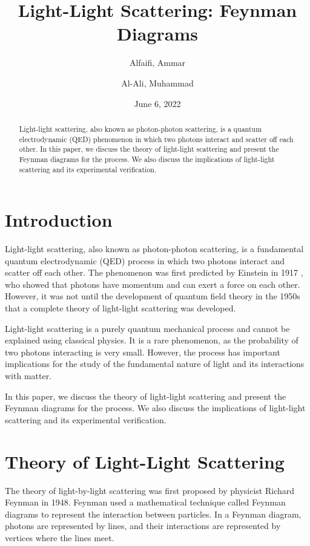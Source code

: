 \documentclass{article}
\title{Light-Light Scattering: Feynman Diagrams}
\author{Alfaifi, Ammar \and Al-Ali, Muhammad}
\date{June 6, 2022}
\begin{document}
\maketitle

\begin{abstract}
	Light-light scattering, also known as photon-photon scattering, is a quantum electrodynamic (QED) phenomenon in which two photons interact and scatter off each other. In this paper, we discuss the theory of light-light scattering and present the Feynman diagrams for the process. We also discuss the implications of light-light scattering and its experimental verification.
\end{abstract}

\section{Introduction}

Light-light scattering, also known as photon-photon scattering, is a fundamental quantum electrodynamic (QED) process in which two photons interact and scatter off each other. The phenomenon was first predicted by Einstein in 1917 \cite{einstein}, who showed that photons have momentum and can exert a force on each other. However, it was not until the development of quantum field theory in the 1950s that a complete theory of light-light scattering was developed.

Light-light scattering is a purely quantum mechanical process and cannot be explained using classical physics. It is a rare phenomenon, as the probability of two photons interacting is very small. However, the process has important implications for the study of the fundamental nature of light and its interactions with matter.

In this paper, we discuss the theory of light-light scattering and present the Feynman diagrams for the process. We also discuss the implications of light-light scattering and its experimental verification.

\section{Theory of Light-Light Scattering}

The theory of light-by-light scattering was first proposed by physicist Richard Feynman in 1948. Feynman used a mathematical technique called Feynman diagrams to represent the interaction between particles. In a Feynman diagram, photons are represented by lines, and their interactions are represented by vertices where the lines meet.
\end{document}
